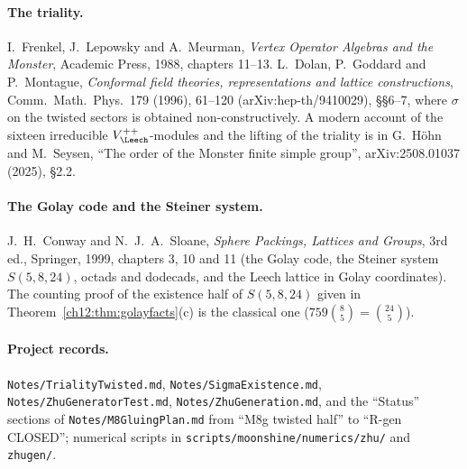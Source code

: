 \paragraph{The triality.}  I.~Frenkel, J.~Lepowsky and A.~Meurman, \emph{Vertex Operator Algebras and
the Monster}, Academic Press, 1988, chapters 11--13.  L.~Dolan, P.~Goddard and P.~Montague, \emph{Conformal
field theories, representations and lattice constructions}, Comm.\ Math.\ Phys.\ 179 (1996), 61--120
(arXiv:hep-th/9410029), §§6--7, where $\sigma$ on the twisted sectors is obtained non-constructively.
A modern account of the sixteen irreducible $V_\Leech^{++}$-modules and the lifting of the triality is in G.~H\"ohn and M.~Seysen, ``The order of the Monster finite simple group'', arXiv:2508.01037 (2025), \S2.2.

\paragraph{The Golay code and the Steiner system.}  J.~H.~Conway and N.~J.~A.~Sloane, \emph{Sphere
Packings, Lattices and Groups}, 3rd ed., Springer, 1999, chapters 3, 10 and 11 (the Golay code, the
Steiner system $S(5,8,24)$, octads and dodecads, and the Leech lattice in Golay coordinates).  The counting
proof of the existence half of $S(5,8,24)$ given in Theorem~\ref{ch12:thm:golayfacts}(c) is the classical
one ($759\binom85=\binom{24}5$).

\paragraph{Project records.}  \texttt{Notes/TrialityTwisted.md}, \texttt{Notes/SigmaExistence.md},
\texttt{Notes/ZhuGeneratorTest.md}, \texttt{Notes/ZhuGeneration.md}, and the ``Status'' sections of
\texttt{Notes/M8GluingPlan.md} from ``M8g twisted half'' to ``R-gen CLOSED''; numerical scripts in
\texttt{scripts/moonshine/numerics/zhu/} and \texttt{zhugen/}.
